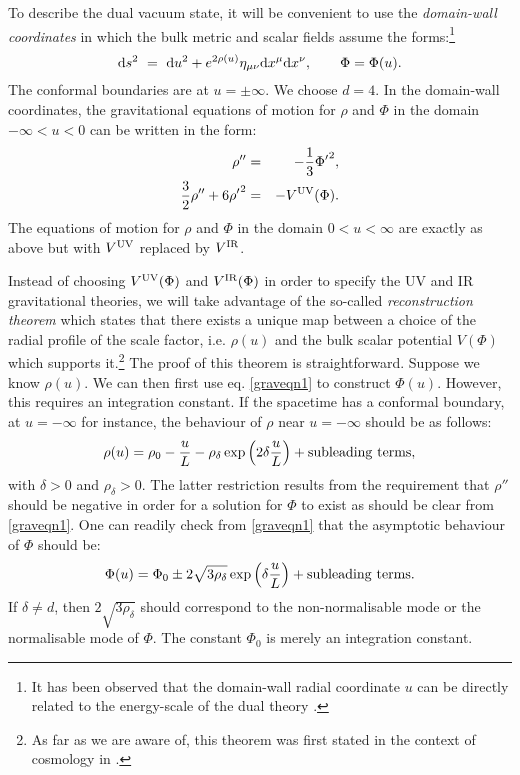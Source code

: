 \documentclass[prd,reprint,a4paper,showpacs,superscriptaddress,11pt,onecolumn,nofootinbib]{revtex4-1}
\renewcommand{\(}{\left(}
\renewcommand{\)}{\right)}
\newcommand{\6}{\partial}
\begin{document}
To describe the dual vacuum state, it will be convenient to use the \textit{domain-wall coordinates} in which the bulk metric and scalar fields assume the forms:\footnote{It has been observed that the domain-wall radial coordinate $u$ can be directly related to the energy-scale of the dual theory \cite{Erdmenger:2001ja,Kiritsis:2014kua,Behr:2015aat}. }
\begin{equation}\label{eqn:metricansatzdomainwall}
{\rm d}s^2 ~ = ~ {\rm d}u^2 + e^{2\rho(u)} \eta_{\mu\nu}{\rm d}x^\mu {\rm d}x^\nu, \qquad \Phi = \Phi(u).
\end{equation}
The conformal boundaries are at $u=\pm\infty$. We choose $d=4$. In the domain-wall coordinates, the gravitational equations of motion for $\rho$ and $\Phi$ in the domain $-\infty < u < 0$ can be written in the form:
\begin{eqnarray}
\rho'' &=& -\frac{1}{3}{\Phi'}^2,\label{graveqn1} \\ 
\frac{3}{2}\rho'' + 6{\rho'}^2 &=& -V^{\rm UV}(\Phi) \label{graveqn2} .
\end{eqnarray}
The equations of motion for $\rho$ and $\Phi$ in the domain $ 0<u<\infty$ are exactly as above but with $V^{\rm UV}$ replaced by $V^{\rm IR}$.

Instead of choosing $V^{\rm UV}(\Phi)$ and $V^{\rm IR}(\Phi)$ in order to specify the UV and IR gravitational theories, we will take advantage of the so-called \textit{reconstruction theorem} which states that there exists a unique map between a choice of the radial profile of the scale factor, i.e. $\rho(u)$ and the bulk scalar potential $V(\Phi)$ which supports it.\footnote{As far as we are aware of, this theorem was first stated in the context of cosmology in \cite{Tsamis:1997rk}.} The proof of this theorem is straightforward. Suppose we know $\rho(u)$. We can then first use eq. \eqref{graveqn1} to construct $\Phi(u)$. However, this requires an integration constant. If the spacetime has a conformal boundary, at $u= -\infty$ for instance, the behaviour of $\rho$ near $u= -\infty$ should be as follows:
\begin{eqnarray}
\rho(u) = \rho_0 - \frac{u}{L} - \rho_{\delta} \exp\left(2\delta\frac{u}{L}\right) + {\rm subleading \,\, terms},
\end{eqnarray}
with $\delta  > 0$ and $\rho_\delta > 0$. The latter restriction results from the requirement that $\rho''$ should be negative in order for a solution for $\Phi$ to exist as should be clear from \eqref{graveqn1}. One can readily check from \eqref{graveqn1} that the asymptotic behaviour of $\Phi$ should be:
\begin{equation}\label{Phir}
\Phi(u) = \Phi_0 \pm 2\sqrt{3 \rho_\delta}  \exp\left(\delta\frac{u}{L}\right) + {\rm subleading \,\, terms}.
\end{equation}
If $\delta \neq d$, then $2\sqrt{3 \rho_\delta}$ should correspond to the non-normalisable mode or the normalisable mode of $\Phi$. The constant $\Phi_0$ is merely an integration constant. 
\end{document}
